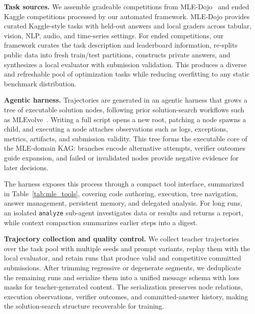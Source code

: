 \documentclass{llmxive}
\begin{document}
\textbf{Task sources.}
We assemble gradeable competitions from MLE-Dojo~\citep{mledojo} and ended Kaggle competitions processed by our automated framework. MLE-Dojo provides curated Kaggle-style tasks with held-out answers and local graders across tabular, vision, NLP, audio, and time-series settings. For ended competitions, our framework curates the task description and leaderboard information, re-splits public data into fresh train/test partitions, constructs private answers, and synthesizes a local evaluator with submission validation. This produces a diverse and refreshable pool of optimization tasks while reducing overfitting to any static benchmark distribution.

\textbf{Agentic harness.}
Trajectories are generated in an agentic harness that grows a tree of executable solution nodes, following prior solution-search workflows such as MLEvolve~\citep{mlevolve}. Writing a full script opens a new root, patching a node spawns a child, and executing a node attaches observations such as logs, exceptions, metrics, artifacts, and submission validity. This tree forms the executable core of the MLE-domain KAG: branches encode alternative attempts, verifier outcomes guide expansion, and failed or invalidated nodes provide negative evidence for later decisions.

The harness exposes this process through a compact tool interface, summarized in Table~\ref{tab:mle_tools}, covering code authoring, execution, tree navigation, answer management, persistent memory, and delegated analysis. For long runs, an isolated \texttt{analyze} sub-agent investigates data or results and returns a report, while context compaction summarizes earlier steps into a digest.

\textbf{Trajectory collection and quality control.}
We collect teacher trajectories over the task pool with multiple seeds and prompt variants, replay them with the local evaluator, and retain runs that produce valid and competitive committed submissions. After trimming regressive or degenerate segments, we deduplicate the remaining runs and serialize them into a unified message schema with loss masks for teacher-generated content. The serialization preserves node relations, execution observations, verifier outcomes, and committed-answer history, making the solution-search structure recoverable for training.
\end{document}
